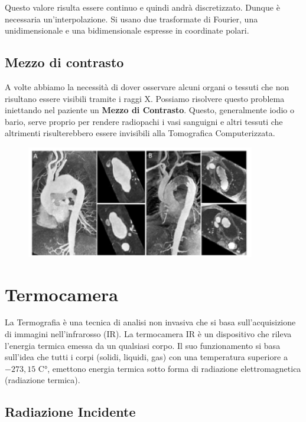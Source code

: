 Questo valore risulta essere continuo e quindi andrà discretizzato. Dunque è necessaria
un'interpolazione. Si usano due trasformate di Fourier, una unidimensionale e una bidimensionale espresse in
coordinate polari.

\section{Mezzo di contrasto}

A volte abbiamo la necessità di dover osservare alcuni organi o tessuti che non
risultano essere visibili tramite i raggi X. Possiamo risolvere questo problema iniettando
nel paziente un \textbf{Mezzo di Contrasto}. Questo, generalmente iodio o bario,
serve proprio per rendere radiopachi i vasi sanguigni e altri tessuti che altrimenti
risulterebbero essere invisibili alla Tomografica Computerizzata.

\begin{figure}[H]
    \centering
    \includegraphics[width=10cm, keepaspectratio]{capitoli/immagini/imgs/angiografia.png}
\end{figure}

\chapter{Termocamera}

La Termografia è una tecnica di analisi non invasiva che si basa
sull'acquisizione di immagini nell'infrarosso (IR). La termocamera IR è un
dispositivo che rileva l'energia termica emessa da un qualsiasi corpo.
Il suo funzionamento si basa sull'idea che tutti i corpi (solidi, liquidi, gas)
con una temperatura superiore a $-273,15$ C°, emettono energia termica sotto
forma di radiazione elettromagnetica (radiazione termica).

\section{Radiazione Incidente}

